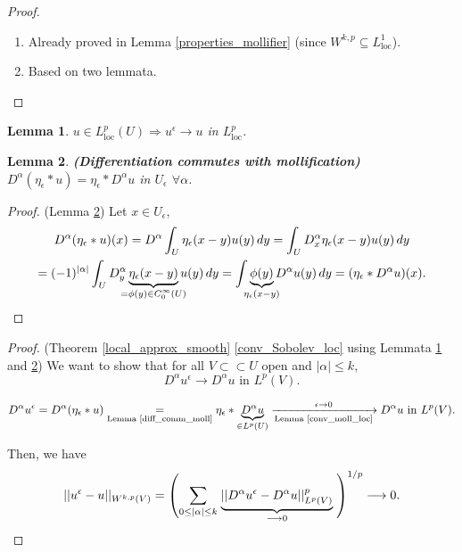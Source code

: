 \documentclass[12pt]{article}
\newtheorem{lemma}{Lemma}[section]
\theoremstyle{definition}
\begin{document}
\begin{proof}
\begin{enumerate}[label=(\roman*)]
\item Already proved in Lemma \ref{properties_mollifier} (since $W^{k,p}\subseteq L_\text{loc}^1$).

\item Based on two lemmata.
\end{enumerate}
\end{proof}

\begin{lemma}\label{conv_moll_loc}
$u\in L_\text{loc}^p(U)\Rightarrow u^\epsilon\rightarrow u$ in $L_\text{loc}^p$.
\end{lemma}

\begin{lemma}\label{diff_comm_moll}
\emph{\textbf{(Differentiation commutes with mollification)}} $D^\alpha(\eta_\epsilon*u)=\eta_\epsilon*D^\alpha u$ in $U_\epsilon$ $\forall\alpha$.
\end{lemma}

\begin{proof}
(Lemma \ref{diff_comm_moll}) Let $x\in U_\epsilon$,
\begin{multline*}
D^\alpha(\eta_\epsilon*u)(x)=D^\alpha\int_U\eta_\epsilon(x-y)u(y)\,dy=\int_UD_x^\alpha\eta_\epsilon(x-y)u(y)\,dy\\
=(-1)^{|\alpha|}\int_UD_y^\alpha\underbrace{\eta_\epsilon(x-y)}_{\mathclap{=\phi(y)\in C_0^\infty(U)}}u(y)\,dy=\int\underbrace{\phi(y)}_{\mathclap{\eta_\epsilon(x-y)}}D^\alpha u(y)\,dy=(\eta_\epsilon*D^\alpha u)(x).
\end{multline*}
\end{proof}

\begin{proof}
(Theorem \ref{local_approx_smooth} \ref{conv_Sobolev_loc} using Lemmata \ref{conv_moll_loc} and \ref{diff_comm_moll}) We want to show that for all $V\subset\subset U$ open and $|\alpha|\leq k$,
\[D^\alpha u^\epsilon\longrightarrow D^\alpha u\text{ in }L^p(V).\]

\[D^\alpha u^\epsilon=D^\alpha(\eta_\epsilon*u)\underset{\text{Lemma \ref{diff_comm_moll}}}=\eta_\epsilon*\underbrace{D^\alpha u}_{\in L^p(U)}\xrightarrow[\text{Lemma \ref{conv_moll_loc}}]{\epsilon\to0}D^\alpha u\text{ in }L^p(V).\]

Then, we have
\[||u^\epsilon-u||_{W^{k,p}(V)}=\left(\sum_{0\leq|\alpha|\leq k}\right.\underbrace{||D^\alpha u^\epsilon-D^\alpha u||_{L^p(V)}^p}_{\longrightarrow0}\left.\vphantom{\sum_{0\leq|\alpha|\leq k}}\right)^{1/p}\longrightarrow0.\]
\end{proof}
\end{document}
